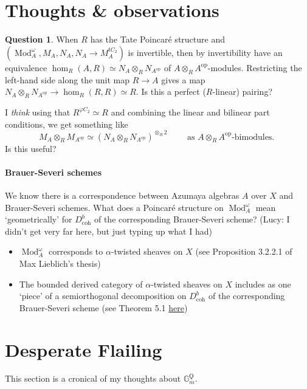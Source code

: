 \documentclass{article}
\DeclareMathOperator{\Mod}{Mod} %
\newcommand{\op}{\mathrm{op}}
\theoremstyle{definition}
\newtheorem{question}[theorem]{Question}
\begin{document}
\section{Thoughts \& observations}
\begin{question}
   When $ R $ has the Tate Poincaré structure and $ (\Mod_A^\omega, M_A, N_A, N_A \to M_A^{tC_2}) $ is invertible, then by invertibility have an equivalence $ \hom_R(A, R)\simeq N_A\otimes_R N_{A^\op} $ of $ A \otimes_R A^\op $-modules. 
   Restricting the left-hand side along the unit map $ R \to A $ gives a map $ N_A \otimes_R N_{A^\op} \to \hom_R(R,R) \simeq R $. 
   Is this a perfect ($R$-linear) pairing? 

   I \emph{think} using that $ R^{\varphi C_2} \simeq R $ and combining the linear and bilinear part conditions, we get something like
   \begin{equation*}
       M_A \otimes_R M_{A^\op} \simeq (N_A \otimes_R N_{A^\op})^{\otimes_R 2} \qquad \text{ as $A \otimes_R A^\op$-bimodules. }
   \end{equation*}
   Is this useful?
\end{question}

\paragraph{Brauer-Severi schemes} 
We know there is a correspondence between Azumaya algebras $ A $ over $ X $ and Brauer-Severi schemes. 
What does a Poincaré structure on $ \Mod_A^\omega $ mean `geometrically' for $ D^b_{\mathrm{coh}} $ of the corresponding Brauer-Severi scheme? 
(Lucy: I didn't get very far here, but just typing up what I had)
\begin{itemize}
    \item $ \Mod_A^\omega $ corresponds to $ \alpha $-twisted sheaves on $ X $ (see Proposition 3.2.2.1 of Max Lieblich's thesis)
    \item The bounded derived category of $ \alpha $-twisted sheaves on $ X $ includes as one `piece' of a semiorthogonal decomposition on $ D^b_{\mathrm{coh}} $ of the corresponding Brauer-Severi scheme (see Theorem 5.1 \href{https://arxiv.org/abs/math/0511497}{here})
\end{itemize}

\section{Desperate Flailing}

This section is a cronical of my thoughts about $\mathbb{G}_m^\Qoppa$.
\end{document}
